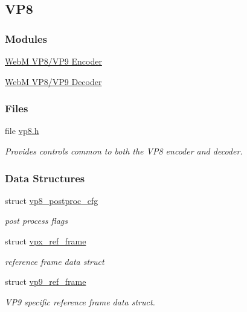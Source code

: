 \hypertarget{group__vp8}{}\subsection{V\+P8}
\label{group__vp8}
\subsubsection*{Modules}
\begin{DoxyCompactItemize}
\item 
\hyperlink{group__vp8__encoder}{Web\+M V\+P8/\+V\+P9 Encoder}
\item 
\hyperlink{group__vp8__decoder}{Web\+M V\+P8/\+V\+P9 Decoder}
\end{DoxyCompactItemize}
\subsubsection*{Files}
\begin{DoxyCompactItemize}
\item 
file \hyperlink{vp8_8h}{vp8.\+h}
\begin{DoxyCompactList}\small\item\em Provides controls common to both the V\+P8 encoder and decoder. \end{DoxyCompactList}\end{DoxyCompactItemize}
\subsubsection*{Data Structures}
\begin{DoxyCompactItemize}
\item 
struct \hyperlink{structvp8__postproc__cfg}{vp8\+\_\+postproc\+\_\+cfg}
\begin{DoxyCompactList}\small\item\em post process flags \end{DoxyCompactList}\item 
struct \hyperlink{structvpx__ref__frame}{vpx\+\_\+ref\+\_\+frame}
\begin{DoxyCompactList}\small\item\em reference frame data struct \end{DoxyCompactList}\item 
struct \hyperlink{structvp9__ref__frame}{vp9\+\_\+ref\+\_\+frame}
\begin{DoxyCompactList}\small\item\em V\+P9 specific reference frame data struct. \end{DoxyCompactList}\end{DoxyCompactItemize}

